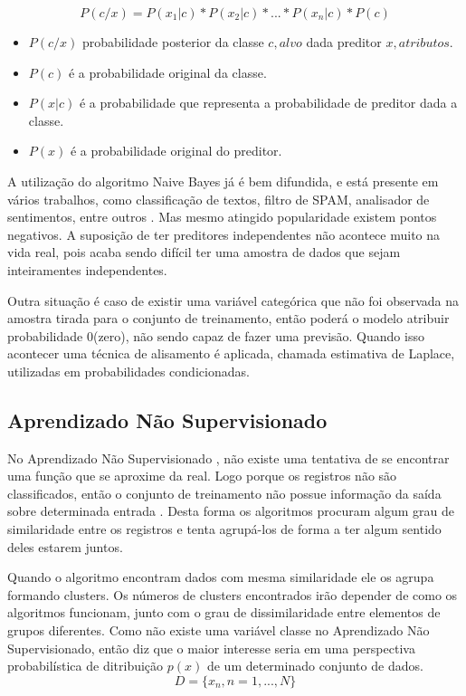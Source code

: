 \begin{equation}
 P(c/x)=P(x_1|c)*P(x_2|c)*...*P(x_n|c)*P(c)
 \label{eq:bayes}
\end{equation}


\begin{itemize}
 \item ${P(c/x)}$ probabilidade posterior da classe ${c,alvo}$ dada preditor ${x,atributos}$.
 \item ${P(c)}$  é a probabilidade original da classe.
 \item ${P(x|c)}$  é a probabilidade que representa a probabilidade de preditor dada a classe.
 \item ${P(x)}$  é a probabilidade original do preditor.
\end{itemize}

A utilização do algoritmo Naive Bayes já é bem difundida, e está presente em vários trabalhos, como classificação de textos, filtro de SPAM, analisador de sentimentos, entre outros \cite{ Madureira2017, Lucca2013, Wu2008, Mccallum1997}. Mas mesmo atingido popularidade existem pontos negativos. A suposição de ter preditores independentes não acontece muito na vida real, pois acaba sendo difícil ter uma amostra de dados que sejam inteiramentes independentes. 

Outra situação é caso de existir uma variável categórica que não foi observada na amostra tirada para o conjunto de treinamento, então poderá o modelo atribuir probabilidade 0(zero), não sendo capaz de fazer uma previsão. Quando isso acontecer uma técnica de alisamento é aplicada, chamada estimativa de Laplace, utilizadas em probabilidades condicionadas.


\subsection{Aprendizado Não Supervisionado}\label{ssec:aprendNSup}

No Aprendizado Não Supervisionado , não existe uma tentativa de se encontrar uma função que se aproxime da real. Logo porque os registros não são classificados, então o conjunto de treinamento não possue informação da saída sobre determinada entrada . Desta forma os algoritmos procuram algum grau de similaridade entre os registros e tenta agrupá-los de forma a ter algum sentido deles estarem juntos. 

Quando o algoritmo encontram dados com mesma similaridade ele os agrupa formando clusters. Os números de clusters encontrados irão depender de como os algoritmos funcionam, junto com o grau de dissimilaridade entre elementos de grupos diferentes. Como não existe uma variável classe no Aprendizado Não Supervisionado, então \cite{Barber2011} diz que o maior interesse seria em uma perspectiva probabilística de ditribuição ${p(x)}$ de um determinado conjunto de dados.
\begin{equation}
 D = \{x_{n},n=1,...,N\}
 \label{eq:aprendNSup}
\end{equation}

